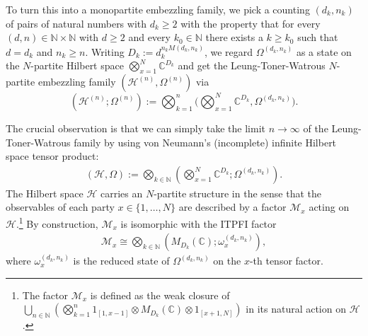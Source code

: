 \documentclass[a4paper, 10pt, onecolumn, accepted=2025-07-22]{quantumarticle}
\theoremstyle{definition}
\newcommand{\oo}{\infty}
\newcommand{\ox}{\otimes}
\newcommand{\mc}{\mathcal}
\newcommand{\up}[1]{^{(#1)}}
\def\CC{{\mathbb C}}
\def\H{{\mc H}}
\def\M{{\mc M}}
\def\NN{{\mathbb N}}
\newcommand*{\1}{\text{\usefont{U}{bbold}{m}{n}1}}
\begin{document}
To turn this into a monopartite embezzling family, we pick a counting $(d_k,n_k)$ of pairs of natural numbers with $d_k\geq 2$ with the property that for every $(d,n)\in\NN\times \NN$ with $d\geq 2$ and every $k_0\in\NN$ there exists a $k\geq k_0$ such that $d=d_k$ and $n_k\geq n$.
Writing $D_k := d_k^{n_k M(d_k,n_k)}$, we regard $\Omega\up{d_k,n_k}$ as a state on the $N$-partite Hilbert space $\bigotimes_{x=1}^N \CC^{D_k}$ and get the Leung-Toner-Watrous $N$-partite embezzling family $(\H\up{n},\Omega\up{n})$ via 
\begin{equation}
    (\H\up{n};\Omega\up{n}) := \bigotimes_{k=1}^n \bigg(\bigotimes_{x=1}^N \CC^{D_k}, \Omega\up{d_k,n_k}\bigg).
\end{equation}

The crucial observation is that we can simply take the limit $n\to \oo$ of the Leung-Toner-Watrous family by using von Neumann's (incomplete) infinite Hilbert space tensor product:
\begin{align}
    (\H,\Omega) := \bigotimes_{k\in\NN} \left(\bigotimes_{x=1}^N \CC^{D_k};\Omega^{(d_k,n_k)}\right).
\end{align}
The Hilbert space $\H$ carries an $N$-partite structure in the sense that the observables of each party $x\in \{1,\ldots,N\}$ are described by a factor $\M_{x}$ acting on $\H$.\footnote{The factor $\M_{x}$ is defined as the weak closure of $\bigcup_{n\in\NN} \left(\bigotimes_{k=1}^n 1_{[1,x-1]} \ox M_{D_k}(\CC) \ox1_{[x+1,N]}\right)$ in its natural action on $\H$.}
By construction, $\M_{x}$ is isomorphic with the ITPFI factor
\begin{align}
\M_{x} \cong \bigotimes_{k\in \NN} (M_{D_k}(\CC); \omega_{x}^{(d_k,n_k)}),
\end{align}
where $\omega_{x}^{(d_k,n_k)}$ is the reduced state of $\Omega^{(d_k,n_k)}$ on the $x$-th tensor factor.
\end{document}
